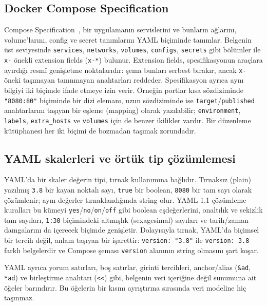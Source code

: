 \documentclass[12pt,a4paper]{article}
\begin{document}
\subsection{Docker Compose Specification}
Compose Specification~\cite{composespec}, bir uygulamanın servislerini ve
bunların ağlarını, volume'larını, config ve secret tanımlarını YAML
biçiminde tanımlar. Belgenin üst seviyesinde \texttt{services},
\texttt{networks}, \texttt{volumes}, \texttt{configs}, \texttt{secrets} gibi
bölümler ile \texttt{x-} önekli extension fields (\texttt{x-*}) bulunur.
Extension fields, spesifikasyonun araçlara ayırdığı resmî genişletme noktalarıdır:
şema bunları serbest bırakır, ancak \texttt{x-} öneki taşımayan tanınmayan
anahtarları reddeder. Spesifikasyon ayrıca aynı bilgiyi iki biçimde ifade
etmeye izin verir. Örneğin portlar kısa sözdiziminde
\texttt{"8080:80"} biçiminde bir dizi elemanı, uzun sözdiziminde ise
\texttt{target}/\texttt{published} anahtarlarını taşıyan bir eşleme
(mapping) olarak yazılabilir; \texttt{environment}, \texttt{labels},
\texttt{extra\_hosts} ve \texttt{volumes} için de benzer ikilikler vardır.
Bir düzenleme kütüphanesi her iki biçimi de bozmadan taşımak zorundadır.

\subsection{YAML skalerleri ve örtük tip çözümlemesi}
YAML'da bir skaler değerin tipi, tırnak kullanımına bağlıdır. Tırnaksız
(plain) yazılmış \texttt{3.8} bir kayan noktalı sayı, \texttt{true} bir
boolean, \texttt{8080} bir tam sayı olarak çözümlenir; aynı değerler
tırnaklandığında string olur. YAML 1.1 çözümleme kuralları bu kümeyi
\texttt{yes}/\texttt{no}/\texttt{on}/\texttt{off} gibi boolean eşdeğerlerini,
onaltılık ve sekizlik tam sayıları, \texttt{1:30} biçimindeki altmışlık
(sexagesimal) sayıları ve tarih/zaman damgalarını da içerecek biçimde
genişletir. Dolayısıyla tırnak, YAML'da biçimsel bir tercih değil, anlam
taşıyan bir işarettir: \texttt{version: "3.8"} ile \texttt{version: 3.8}
farklı belgelerdir ve Compose şeması \texttt{version} alanının string
olmasını şart koşar.

YAML ayrıca yorum satırları, boş satırlar, girinti tercihleri, anchor/alias
(\texttt{\&ad}, \texttt{*ad}) ve birleştirme anahtarı (\texttt{<<}) gibi,
belgenin veri içeriğine değil sunumuna ait öğeler barındırır. Bu öğelerin
bir kısmı ayrıştırma sırasında veri modeline hiç taşınmaz.
\end{document}
